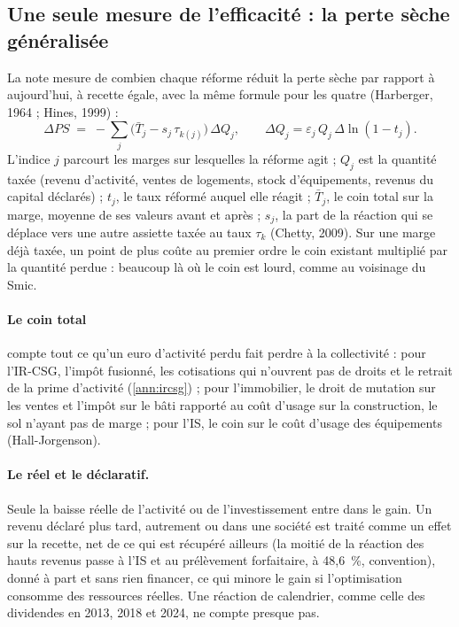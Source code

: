 
\subsection{Une seule mesure de l'efficacité : la perte sèche généralisée}\label{ann:meth_ps}

La note mesure de combien chaque réforme réduit la perte sèche par rapport à aujourd'hui, à recette égale, avec la
même formule pour les quatre (Harberger, 1964 ; Hines, 1999) :
\[
\Delta PS \;=\; -\sum_j \big(\bar T_j - s_j\,\tau_{k(j)}\big)\,\Delta Q_j ,\qquad
\Delta Q_j = \varepsilon_j\,Q_j\,\Delta\ln(1-t_j).
\]
L'indice $j$ parcourt les marges sur lesquelles la réforme agit ; $Q_j$ est la quantité taxée (revenu d'activité,
ventes de logements, stock d'équipements, revenus du capital déclarés) ; $t_j$, le taux réformé auquel elle réagit ;
$\bar T_j$, le coin total sur la marge, moyenne de ses valeurs avant et après ; $s_j$, la part de la réaction qui se
déplace vers une autre assiette taxée au taux $\tau_k$ (Chetty, 2009). Sur une marge déjà taxée, un point de plus coûte
au premier ordre le coin existant multiplié par la quantité perdue : beaucoup là où le coin est lourd, comme au
voisinage du Smic.

\paragraph{Le coin total} compte tout ce qu'un euro d'activité perdu fait perdre à la collectivité : pour l'IR-CSG,
l'impôt fusionné, les cotisations qui n'ouvrent pas de droits et le retrait de la prime d'activité (\ref{ann:ircsg}) ;
pour l'immobilier, le droit de mutation sur les ventes et l'impôt sur le bâti rapporté au coût d'usage sur la
construction, le sol n'ayant pas de marge ; pour l'IS, le coin sur le coût d'usage des équipements (Hall-Jorgenson).

\paragraph{Le réel et le déclaratif.} Seule la baisse réelle de l'activité ou de l'investissement entre dans le gain.
Un revenu déclaré plus tard, autrement ou dans une société est traité comme un effet sur la recette, net de ce qui est
récupéré ailleurs (la moitié de la réaction des hauts revenus passe à l'IS et au prélèvement forfaitaire, à 48,6~\%,
convention), donné à part et sans rien financer, ce qui minore le gain si l'optimisation consomme des ressources
réelles. Une réaction de calendrier, comme celle des dividendes en 2013, 2018 et 2024, ne compte presque pas.

